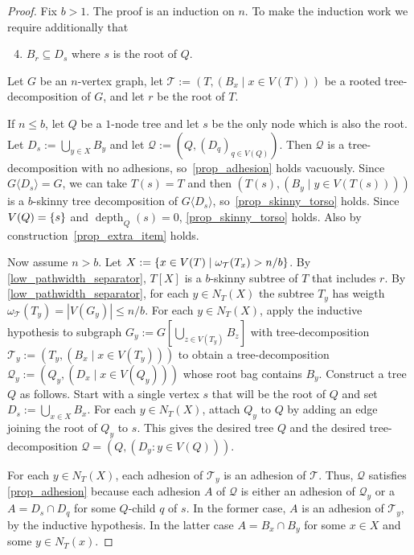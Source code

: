 \documentclass{patmorin}
\renewcommand{\le}{\leqslant}
\newcommand{\torso}[2]{{#1}\langle{#2}\rangle}
\DeclareMathOperator{\depth}{depth}
\DeclarePairedDelimiter{\set}{\{}{\}}
\begin{document}
  \begin{proof}
    Fix $b>1$.
    The proof is an induction on $n$.
    To make the induction work we require additionally that
    \begin{enumerate}[nosep,nolistsep,label=(\alph*)]
    \setcounter{enumi}{3}
    \item\label{prop_extra_item} $B_r \subseteq D_s$ where $s$ is the root of $Q$.
    \end{enumerate}
    Let $G$ be an $n$-vertex graph, let $\mathcal{T}:=(T,(B_x\mid x\in V(T)))$ be a rooted tree-decomposition of $G$, and let $r$ be the root of $T$.

If $n\le b$, let $Q$ be a $1$-node tree and let $s$ be the only node which is also the root.
Let $D_s:=\bigcup_{y\in X} B_y$ and let $\mathcal{Q}:=(Q,(D_q)_{q\in V(Q)})$.
Then $\mathcal{Q}$ is a tree-decomposition with no adhesions, so~\ref{prop_adhesion} holds vacuously.
Since $\torso{G}{D_s}=G$, we can take $T(s)=T$ and then $(T(s),(B_y\mid y\in V(T(s))))$ is a $b$-skinny tree decomposition of $\torso{G}{D_s}$,
so~\ref{prop_skinny_torso} holds.
Since $V(Q)=\set{s}$ and $\depth_Q(s)=0$, \ref{prop_skinny_torso}  holds.
Also by construction~\ref{prop_extra_item} holds.

    Now assume $n> b$.
    Let $X:=\set{x\in V(T)\mid  \omega_\mathcal{T}(T_x)>n/b}$.
    By \cref{low_pathwidth_separator}, $T[X]$ is a $b$-skinny subtree of $T$ that includes $r$.
    By \cref{low_pathwidth_separator}, for each $y\in N_T(X)$ the subtree $T_y$ has weigth $\omega_\mathcal{T}(T_y)=|V(G_y)|\le n/b$. For each $y\in N_T(X)$, apply the inductive hypothesis to subgraph $G_y:=G[\bigcup_{z\in V(T_y)} B_z]$ with tree-decomposition $\mathcal{T}_y:=(T_y, (B_x\mid x\in V(T_y)))$ to obtain a tree-decomposition $\mathcal{Q}_{y}:=(Q_y,(D_x \mid x\in V(Q_y)))$ whose root bag contains $B_y$.
    Construct a tree $Q$ as follows.
    Start with a single vertex $s$ that will be the root of $Q$ and set $D_s:=\bigcup_{x\in X} B_x$.
    For each $y\in N_T(X)$, attach $Q_y$ to $Q$ by adding an edge joining the root of $Q_y$ to $s$.
    This gives the desired tree $Q$ and the desired tree-decomposition $\mathcal{Q}=(Q,(D_y:y\in V(Q)))$.

    For each $y\in N_T(X)$, each adhesion of $\mathcal{T}_y$ is an adhesion of $\mathcal{T}$.
    Thus, $\mathcal{Q}$ satisfies \ref{prop_adhesion} because each adhesion $A$ of $\mathcal{Q}$ is either an adhesion of $\mathcal{Q}_y$ or a $A=D_s\cap D_{q}$ for some $Q$-child $q$ of $s$.  In the former case, $A$ is an adhesion of $\mathcal{T}_y$, by the inductive hypothesis. In the latter case $A=B_x\cap B_y$ for some $x\in X$ and some $y\in N_T(x)$.




\end{proof}
\end{document}
